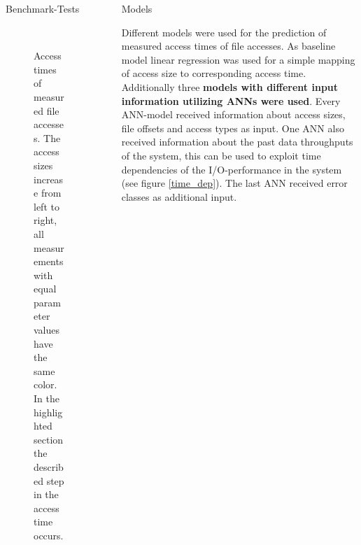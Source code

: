 \documentclass[final]{beamer}
\newlength{\sepwid}
\newlength{\onecolwid}
\begin{document}
\begin{frame}[t]
\begin{columns}[t]
\begin{column}{\onecolwid}
\begin{block}{Benchmark-Tests}
		\begin{figure}
			\\
			\vspace*{0.25cm}	
			\hspace*{-7.365cm}		
			\vspace*{-0.05cm}	
			\caption{Access times of measured file accesses. The access sizes increase from left to right, all measurements with equal parameter values have the same color. In the highlighted section the described step in the access time occurs.}
			\label{exploration}
		\end{figure} 
	
\end{block}
	
\end{column} %

\begin{column}{\sepwid}\end{column} %

\begin{column}{\onecolwid} %
	

\begin{block}{Models}
	
	Different models were used for the prediction of measured access times of file accesses.
	As baseline model linear regression was used for a simple mapping of access size to corresponding access time.
	Additionally three \textbf{models with different input information utilizing ANNs were used}.
	Every ANN-model received information about access sizes, file offsets and access types as input.
	One ANN also received information about the past data throughputs of the system, this can be used to exploit time dependencies of the I/O-performance in the system (see figure \ref{time_dep}). The last ANN received error classes as additional input.
	

\end{block}
\end{column}
\end{columns}
\end{frame}
\end{document}
